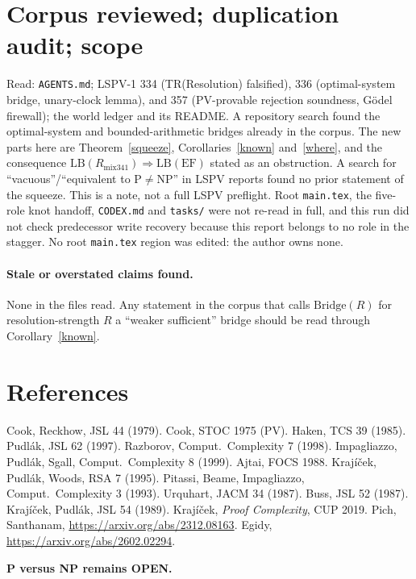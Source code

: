 \documentclass[11pt]{article}
\theoremstyle{definition}
\begin{document}
\section{Corpus reviewed; duplication audit; scope}
Read: \texttt{AGENTS.md}; LSPV-1 334 (TR(Resolution) falsified), 336 (optimal-system bridge, unary-clock lemma), and 357 (PV-provable rejection soundness, G\"odel firewall); the world ledger and its README. A repository search found the optimal-system and bounded-arithmetic bridges already in the corpus. The new parts here are Theorem~\ref{squeeze}, Corollaries~\ref{known} and~\ref{where}, and the consequence $\mathrm{LB}(R_{\mathrm{mix341}})\Rightarrow\mathrm{LB}(\mathrm{EF})$ stated as an obstruction. A search for ``vacuous''/``equivalent to P$\ne$NP'' in LSPV reports found no prior statement of the squeeze. This is a note, not a full LSPV preflight. Root \texttt{main.tex}, the five-role knot handoff, \texttt{CODEX.md} and \texttt{tasks/} were not re-read in full, and this run did not check predecessor write recovery because this report belongs to no role in the stagger. No root \texttt{main.tex} region was edited: the author owns none.

\paragraph{Stale or overstated claims found.} None in the files read. Any statement in the corpus that calls $\mathrm{Bridge}(R)$ for resolution-strength $R$ a ``weaker sufficient'' bridge should be read through Corollary~\ref{known}.

\section*{References}
Cook, Reckhow, JSL 44 (1979). Cook, STOC 1975 (PV). Haken, TCS 39 (1985). Pudl\'ak, JSL 62 (1997). Razborov, Comput.\ Complexity 7 (1998). Impagliazzo, Pudl\'ak, Sgall, Comput.\ Complexity 8 (1999). Ajtai, FOCS 1988. Kraj\'i\v{c}ek, Pudl\'ak, Woods, RSA 7 (1995). Pitassi, Beame, Impagliazzo, Comput.\ Complexity 3 (1993). Urquhart, JACM 34 (1987). Buss, JSL 52 (1987). Kraj\'i\v{c}ek, Pudl\'ak, JSL 54 (1989). Kraj\'i\v{c}ek, \emph{Proof Complexity}, CUP 2019. Pich, Santhanam, \url{https://arxiv.org/abs/2312.08163}. Egidy, \url{https://arxiv.org/abs/2602.02294}.

\bigskip\noindent\textbf{P versus NP remains OPEN.}
\end{document}
